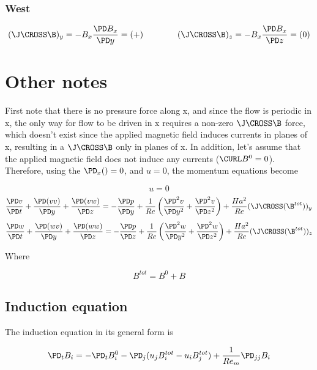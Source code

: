 \documentclass[11pt]{article}
\begin{document}
\subsubsection{West}
\begin{equation}
	(\J \CROSS \B)_y = - B_x \frac{\PD B_x}{\PD y} = (+)
	\qquad \qquad
	(\J \CROSS \B)_z = - B_x \frac{\PD B_x}{\PD z} = (0)
\end{equation}

\section{Other notes}

First note that there is no pressure force along x, and since the flow is periodic in x, the only way for flow to be driven in x requires a non-zero $\J \CROSS \B$ force, which doesn't exist since the applied magnetic field induces currents in planes of x, resulting in a $\J \CROSS \B$ only in planes of x. In addition, let's assume that the applied magnetic field does not induce any currents ($\CURL B^0=0$). Therefore, using the $\PD_x () = 0$, and $u = 0$, the momentum equations become

\begin{equation}
	u=0
\end{equation}
\begin{equation}
	\frac{\PD v}{\PD t}
	+ \frac{\PD (v v)}{\PD y}
	+ \frac{\PD (v w)}{\PD z}
	=
	- \frac{\PD p}{\PD y}
	+ \frac{1}{Re}
	\left(
	\frac{\PD^2 v}{\PD y^2}
	+\frac{\PD^2 v}{\PD z^2}
	\right)
	+ \frac{Ha^2}{Re}
	(\J \CROSS (\B^{tot}))_y
\end{equation}
\begin{equation}
	\frac{\PD w}{\PD t}
	+ \frac{\PD (w v)}{\PD y}
	+ \frac{\PD (w w)}{\PD z}
	=
	- \frac{\PD p}{\PD z}
	+ \frac{1}{Re}
	\left(
	\frac{\PD^2 w}{\PD y^2}
	+\frac{\PD^2 w}{\PD z^2}
	\right)
	+ \frac{Ha^2}{Re}
	(\J \CROSS (\B^{tot}))_z
\end{equation}

Where

\begin{equation}
	B^{tot} = B^0 + B
\end{equation}

\subsection{Induction equation}

The induction equation in its general form is

\begin{equation}
	\PD_t B_i
	=
	- \PD_t B_i^0
	- \PD_j (u_j B_i^{tot} - u_i B_j^{tot})
	+
	\frac{1}{Re_m}
	\PD_{jj} B_i
\end{equation}
\end{document}

